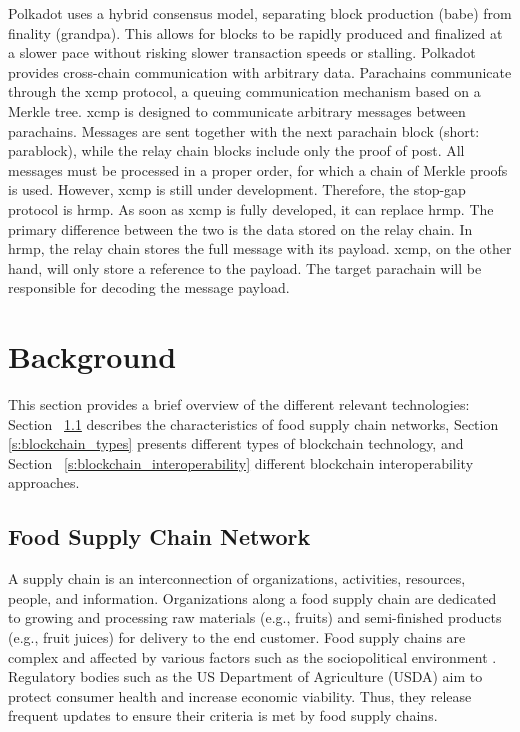 \documentclass[conference]{IEEEtran}
\begin{document}
Polkadot uses a hybrid consensus model, separating block production (\ac{babe}) from finality (\ac{grandpa}). This allows for blocks to be rapidly produced and finalized at a slower pace without risking slower transaction speeds or stalling.  Polkadot provides cross-chain communication with arbitrary data. Parachains communicate through the \ac{xcmp} protocol, a queuing communication mechanism based on a Merkle tree. \ac{xcmp} is designed to communicate arbitrary messages between parachains. Messages are sent together with the next parachain block (short: parablock), while the relay chain blocks include only the proof of post. All messages must be processed in a proper order, for which a chain of Merkle proofs is used. However, \ac{xcmp} is still under development. Therefore, the stop-gap protocol is \ac{hrmp}. As soon as \ac{xcmp} is fully developed, it can replace \ac{hrmp}. The primary difference between the two is the data stored on the relay chain. In \ac{hrmp}, the relay chain stores the full message with its payload. \ac{xcmp}, on the other hand, will only store a reference to the payload. The target parachain will be responsible for decoding the message payload.

\section{Background} \label{s:background}
This section provides a brief overview of the different relevant technologies: Section~ \ref{s:fscn} describes the characteristics of food supply chain networks, Section~ \ref{s:blockchain_types} presents different types of blockchain technology, and Section~ \ref{s:blockchain_interoperability} different blockchain interoperability approaches.

\subsection{Food Supply Chain Network} \label{s:fscn}
A supply chain is an interconnection of organizations, activities, resources, people, and information. Organizations along a food supply chain are dedicated to growing and processing raw materials (e.g., fruits) and semi-finished products (e.g., fruit juices) for delivery to the end customer. Food supply chains are complex and affected by various factors such as the sociopolitical environment \cite{van2005innovations}. Regulatory bodies such as the US Department of Agriculture (USDA) aim to protect consumer health and increase economic viability. Thus, they release frequent updates to ensure their criteria is met by food supply chains.
\end{document}
